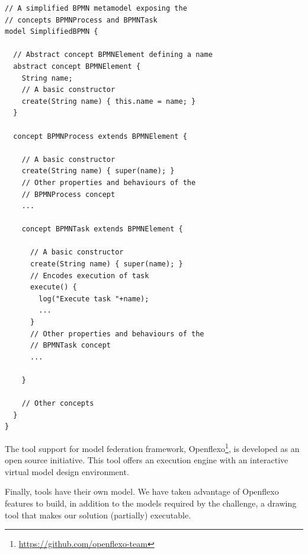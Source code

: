 \begin{lstlisting}
// A simplified BPMN metamodel exposing the
// concepts BPMNProcess and BPMNTask
model SimplifiedBPMN {

  // Abstract concept BPMNElement defining a name
  abstract concept BPMNElement {
    String name;
    // A basic constructor
    create(String name) { this.name = name; }
  }

  concept BPMNProcess extends BPMNElement {

    // A basic constructor
    create(String name) { super(name); }
    // Other properties and behaviours of the
    // BPMNProcess concept
    ...

    concept BPMNTask extends BPMNElement {

      // A basic constructor
      create(String name) { super(name); }
      // Encodes execution of task
      execute() {
        log("Execute task "+name);
        ...
      }
      // Other properties and behaviours of the
      // BPMNTask concept
      ...

    }

    // Other concepts
  }
}
\end{lstlisting}


The tool support for model federation framework,
Openflexo\footnote{\url{https://github.com/openflexo-team}}, is
developed as an open source initiative. This tool offers an \FML
execution engine with an interactive virtual model design environment.

Finally, tools have their own model. We have taken advantage of Openflexo features to build, in addition to the models  required by the challenge, a drawing tool that makes our
solution (partially) executable.
